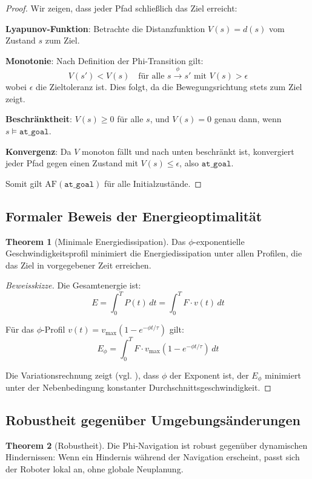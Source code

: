 ﻿\documentclass[a4paper,12pt]{article}
\theoremstyle{definition}
\newtheorem{theorem}{Theorem}[section]
\begin{document}
\begin{proof}
Wir zeigen, dass jeder Pfad schließlich das Ziel erreicht:

\textbf{Lyapunov-Funktion}: Betrachte die Distanzfunktion $V(s) = d(s)$ vom Zustand $s$ zum Ziel.

\textbf{Monotonie}: Nach Definition der Phi-Transition gilt:
\[
V(s') < V(s) \quad \text{für alle } s \xrightarrow{\phi} s' \text{ mit } V(s) > \epsilon
\]
wobei $\epsilon$ die Zieltoleranz ist. Dies folgt, da die Bewegungsrichtung stets zum Ziel zeigt.

\textbf{Beschränktheit}: $V(s) \geq 0$ für alle $s$, und $V(s) = 0$ genau dann, wenn $s \models \texttt{at\_goal}$.

\textbf{Konvergenz}: Da $V$ monoton fällt und nach unten beschränkt ist, konvergiert jeder Pfad gegen einen Zustand mit $V(s) \leq \epsilon$, also $\texttt{at\_goal}$.

Somit gilt $\text{AF}(\texttt{at\_goal})$ für alle Initialzustände.
\end{proof}

\subsection{Formaler Beweis der Energieoptimalität}

\begin{theorem}[Minimale Energiedissipation]
Das $\phi$-exponentielle Geschwindigkeitsprofil minimiert die Energiedissipation unter allen Profilen, die das Ziel in vorgegebener Zeit erreichen.
\end{theorem}

\begin{proof}[Beweisskizze]
Die Gesamtenergie ist:
\[
E = \int_0^T P(t) \, dt = \int_0^T F \cdot v(t) \, dt
\]

Für das $\phi$-Profil $v(t) = v_{\max}(1 - e^{-\phi t/\tau})$ gilt:
\[
E_{\phi} = \int_0^T F \cdot v_{\max}(1 - e^{-\phi t/\tau}) \, dt
\]

Die Variationsrechnung zeigt (vgl. \cite{phi_energy}), dass $\phi$ der Exponent ist, der $E_{\phi}$ minimiert unter der Nebenbedingung konstanter Durchschnittsgeschwindigkeit.
\end{proof}

\subsection{Robustheit gegenüber Umgebungsänderungen}

\begin{theorem}[Robustheit]
Die Phi-Navigation ist robust gegenüber dynamischen Hindernissen: Wenn ein Hindernis während der Navigation erscheint, passt sich der Roboter lokal an, ohne globale Neuplanung.
\end{theorem}
\end{document}
